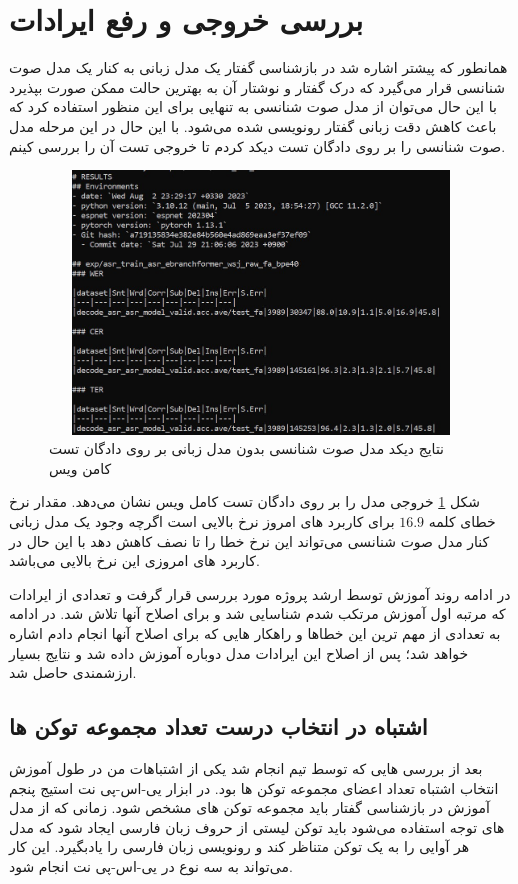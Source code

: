 \section{بررسی خروجی و رفع ایرادات}

همانطور که پیشتر اشاره شد در بازشناسی گفتار یک مدل زبانی به کنار یک مدل صوت شنانسی قرار می‌گیرد که درک گفتار و نوشتار آن به بهترین حالت ممکن صورت بپذیرد با این حال می‌توان از مدل صوت شنانسی به تنهایی برای این منظور استفاده کرد که باعث کاهش دقت زبانی گفتار رونویسی شده می‌شود. با این حال در این مرحله مدل صوت شنانسی را بر روی دادگان تست دیکد کردم تا خروجی تست آن را بررسی کینم.

\begin{figure}[H]
  \centering
  \includegraphics[width=1\textwidth,height=7cm]{Images/Chapter3/decode.jpeg}
  \caption{
  نتایج دیکد مدل صوت شنانسی بدون مدل زبانی بر روی دادگان تست کامن ویس
  }
  \label{fig:decode1}
\end{figure}

شکل \ref{fig:decode1} خروجی مدل را بر روی دادگان تست کامل ویس نشان می‌دهد.
مقدار نرخ خطای کلمه $16.9$ برای کاربرد های امروز نرخ بالایی است اگرچه وجود یک مدل زبانی کنار مدل صوت شنانسی می‌تواند این نرخ خطا را تا نصف کاهش دهد با این حال در کاربرد های امروزی این نرخ بالایی می‌باشد.

در ادامه روند آموزش توسط ارشد پروژه مورد بررسی قرار گرفت و تعدادی از ایرادات که مرتبه اول آموزش مرتکب شدم شناسایی شد و برای اصلاح آنها تلاش شد. در ادامه به تعدادی از مهم ترین این خطاها و راهکار هایی که برای اصلاح آنها انجام دادم اشاره خواهد شد؛ پس از اصلاح این ایرادات مدل دوباره آموزش داده شد و نتایج بسیار ارزشمندی حاصل شد.
\subsection{اشتباه در انتخاب درست تعداد مجموعه توکن ها}
بعد از بررسی هایی که توسط تیم انجام شد یکی از اشتباهات من در طول آموزش انتخاب اشتباه تعداد اعضای مجموعه توکن ها بود.
در ابزار یی-اس-پی نت استیج پنجم آموزش در بازشناسی گفتار باید مجموعه توکن های مشخص شود. زمانی که از مدل های
توجه
استفاده می‌شود باید توکن لیستی از حروف زبان فارسی ایجاد شود که مدل هر آوایی را به یک توکن متناظر کند و رونویسی زبان فارسی را یادبگیرد.
این کار می‌تواند به سه نوع در یی-اس-پی نت انجام شود.

